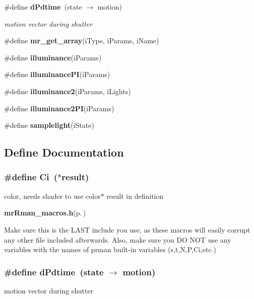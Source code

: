 \begin{CompactItemize}
\#define {\bf d\-Pdtime}\ (state $\rightarrow$ motion)
\begin{CompactList}\small\item\em motion vector during shutter \item\end{CompactList}\item 
\#define {\bf mr\_\-get\_\-array}(i\-Type, i\-Params, i\-Name)
\item 
\#define {\bf illuminance}(i\-Params)
\item 
\#define {\bf illuminance\-PI}(i\-Params)
\item 
\#define {\bf illuminance2}(i\-Params, i\-Lights)
\item 
\#define {\bf illuminance2PI}(i\-Params)
\item 
\#define {\bf samplelight}(i\-State)
\end{CompactItemize}


\subsection{Define Documentation}
\subsubsection{\setlength{\rightskip}{0pt plus 5cm}\#define Ci\ ($\ast$result)}\label{mrRman__macros_8h_a0}


color, needs shader to use color$\ast$ result in definition 

{\bf mr\-Rman\_\-macros.h}{\rm (p.\,\pageref{mrRman__macros_8h})}

Make sure this is the LAST include you use, as these macros will easily corrupt any other file included afterwards. Also, make sure you DO NOT use any variables with the names of prman built-in variables (s,t,N,P,Ci,etc.) 
\subsubsection{\setlength{\rightskip}{0pt plus 5cm}\#define d\-Pdtime\ (state $\rightarrow$ motion)}\label{mrRman__macros_8h_a14}


motion vector during shutter 

